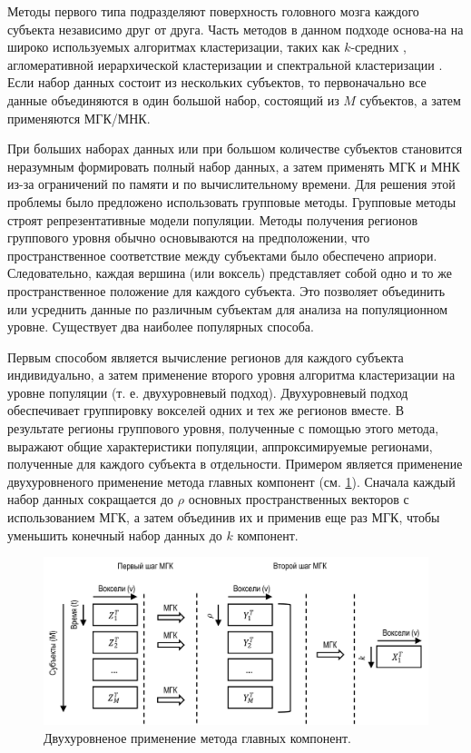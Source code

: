 Методы первого типа подразделяют поверхность головного мозга каждого субъекта независимо друг от друга. Часть методов 
в данном подходе основа-на на широко используемых алгоритмах кластеризации, таких как $k$-средних 
\cite{arslan2015multi}, агломеративной иерархической кластеризации \cite{blumensath2013spatially} и 
спектральной кластеризации \cite{van2008normalized}. Если набор данных состоит из нескольких субъектов, 
то первоначально все данные объединяются в один большой набор, состоящий из $M$ субъектов, а затем применяются МГК/МНК.

При больших наборах данных или при большом количестве субъектов становится неразумным формировать полный набор 
данных, а затем применять МГК и МНК из-за ограничений по памяти и по вычислительному времени. Для решения этой 
проблемы было предложено использовать групповые методы. Групповые методы строят репрезентативные модели популяции. 
Методы получения регионов группового уровня обычно основываются на предположении, что пространственное соответствие 
между субъектами было обеспечено априори. Следовательно, каждая вершина (или воксель) представляет собой одно и 
то же пространственное положение для каждого субъекта. Это позволяет объединить или усреднить данные по различным 
субъектам для анализа на популяционном уровне. Существует два наиболее популярных способа.

Первым способом является вычисление регионов для каждого субъекта индивидуально, а затем применение второго уровня 
алгоритма кластеризации на уровне популяции (т. е. двухуровневый подход). Двухуровневый подход обеспечивает 
группировку вокселей одних и тех же регионов вместе. В результате регионы группового уровня, полученные с помощью 
этого метода, выражают общие характеристики популяции, аппроксимируемые регионами, полученные для каждого субъекта 
в отдельности. Примером является применение двухуровненого применение метода главных компонент 
\cite{calhoun2001method} (см. \cref{fig:two_step_pca}). Сначала каждый набор данных сокращается до $\rho$ основных 
пространственных векторов с использованием МГК, а затем объединив их и применив еще раз  МГК, чтобы уменьшить 
конечный набор данных до $k$ компонент.

\begin{figure}[ht]
    \centering
    \includegraphics[width=1.0\linewidth]{images/two_step_pca.pdf}
    \caption{Двухуровненое применение метода главных компонент.}\label{fig:two_step_pca}
\end{figure}

